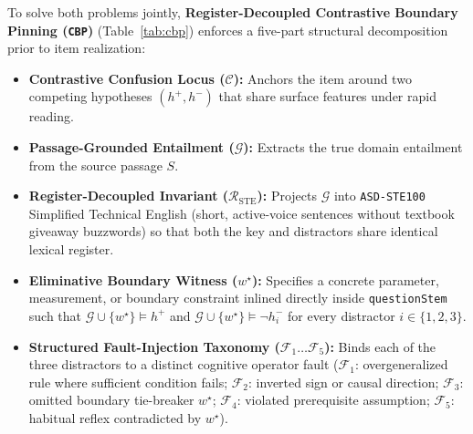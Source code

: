 \documentclass[11pt,a4paper]{article}
\begin{document}
To solve both problems jointly, \textbf{Register-Decoupled Contrastive Boundary Pinning (\texttt{CBP})} (Table~\ref{tab:cbp}) enforces a five-part structural decomposition prior to item realization:
\begin{itemize}
  \item \textbf{Contrastive Confusion Locus ($\mathcal{C}$):} Anchors the item around two competing hypotheses $(h^+, h^-)$ that share surface features under rapid reading.
  \item \textbf{Passage-Grounded Entailment ($\mathcal{G}$):} Extracts the true domain entailment from the source passage $S$.
  \item \textbf{Register-Decoupled Invariant ($\mathcal{R}_{\text{STE}}$):} Projects $\mathcal{G}$ into \texttt{ASD-STE100} Simplified Technical English (short, active-voice sentences without textbook giveaway buzzwords) so that both the key and distractors share identical lexical register.
  \item \textbf{Eliminative Boundary Witness ($w^\star$):} Specifies a concrete parameter, measurement, or boundary constraint inlined directly inside \texttt{questionStem} such that $\mathcal{G} \cup \{w^\star\} \models h^+$ and $\mathcal{G} \cup \{w^\star\} \models \neg h_i^-$ for every distractor $i \in \{1,2,3\}$.
  \item \textbf{Structured Fault-Injection Taxonomy ($\mathcal{F}_1\dots\mathcal{F}_5$):} Binds each of the three distractors to a distinct cognitive operator fault ($\mathcal{F}_1$: overgeneralized rule where sufficient condition fails; $\mathcal{F}_2$: inverted sign or causal direction; $\mathcal{F}_3$: omitted boundary tie-breaker $w^\star$; $\mathcal{F}_4$: violated prerequisite assumption; $\mathcal{F}_5$: habitual reflex contradicted by $w^\star$).
\end{itemize}
\end{document}
